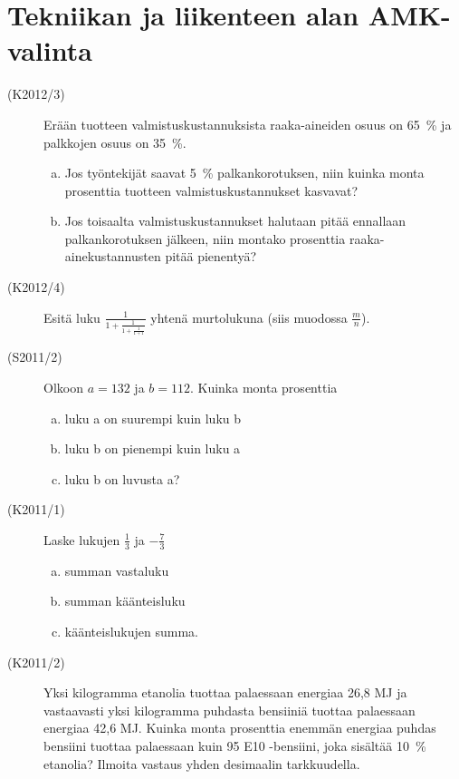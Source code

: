 \section{Tekniikan ja liikenteen alan AMK-valinta}

\begin{description}
	\item[(K2012/3)] Erään tuotteen valmistuskustannuksista raaka-aineiden osuus on
        65~\% ja palkkojen osuus on 35~\%.
        
    	\begin{enumerate}[(a)]
    		\item Jos työntekijät saavat 5~\% palkankorotuksen, niin kuinka monta
                prosenttia tuotteen valmistuskustannukset kasvavat?
    		\item Jos toisaalta valmistuskustannukset halutaan pitää ennallaan
                palkankorotuksen jälkeen, niin montako prosenttia raaka-ainekustannusten
                pitää pienentyä?
    	\end{enumerate}	 

	\item[(K2012/4)] Esitä luku $\frac{1}{1+\frac{1}{1+\frac{1}{1+1}}}$ yhtenä murtolukuna (siis muodossa $\frac{m}{n}$).
	\item[(S2011/2)] Olkoon $a=132$ ja  $b=112$. Kuinka monta prosenttia 
		\begin{enumerate}[(a)]
			\item luku a on suurempi kuin luku b
			\item luku b on pienempi kuin luku a
			\item luku b on luvusta a? 
		\end{enumerate}
	\item[(K2011/1)] Laske lukujen $\frac{1}{3}$ ja $-\frac{7}{3}$
		\begin{enumerate}[(a)]
			\item summan vastaluku
			\item summan käänteisluku 
			\item käänteislukujen summa.
		\end{enumerate}
	\item[(K2011/2)] Yksi kilogramma etanolia tuottaa palaessaan energiaa 26,8 MJ
        ja vastaavasti yksi kilogramma puhdasta bensiiniä tuottaa palaessaan energiaa
        42,6 MJ. Kuinka monta prosenttia enemmän energiaa puhdas bensiini tuottaa
        palaessaan kuin 95 E10 -bensiini, joka sisältää 10~\% etanolia? Ilmoita
        vastaus yhden desimaalin tarkkuudella. 
\end{description}
